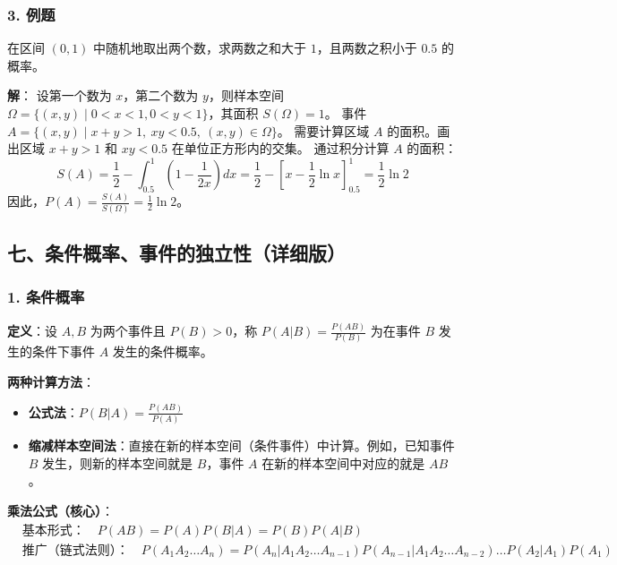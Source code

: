 \documentclass[12pt,a4paper]{ctexart}
\begin{document}
\subsubsection{3. 例题}
在区间 $(0,1)$ 中随机地取出两个数，求两数之和大于 $1$，且两数之积小于 $0.5$ 的概率。

\textbf{解}：
设第一个数为 $x$，第二个数为 $y$，则样本空间 $\Omega = \{(x,y) \mid 0 < x < 1, 0 < y < 1\}$，其面积 $S(\Omega) = 1$。
事件 $A = \{(x,y) \mid x+y > 1,\ xy < 0.5,\ (x,y) \in \Omega\}$。
需要计算区域 $A$ 的面积。画出区域 $x+y>1$ 和 $xy<0.5$ 在单位正方形内的交集。
通过积分计算 $A$ 的面积：
\[
    S(A) = \frac{1}{2} - \int_{0.5}^{1} \left(1 - \frac{1}{2x}\right) dx = \frac{1}{2} - \left[x - \frac{1}{2}\ln x\right]_{0.5}^{1} = \frac{1}{2} \ln 2
\]
因此，$\displaystyle P(A) = \frac{S(A)}{S(\Omega)} = \boxed{\frac{1}{2}\ln 2}$。

\subsection{七、条件概率、事件的独立性（详细版）}

\subsubsection{1. 条件概率}
\textbf{定义}：设 $A, B$ 为两个事件且 $P(B) > 0$，称 $\displaystyle P(A|B) = \frac{P(AB)}{P(B)}$ 为在事件 $B$ 发生的条件下事件 $A$ 发生的条件概率。

\textbf{两种计算方法}：
\begin{itemize}[noitemsep]
    \item \textbf{公式法}：$\displaystyle P(B|A) = \frac{P(AB)}{P(A)}$
    \item \textbf{缩减样本空间法}：直接在新的样本空间（条件事件）中计算。例如，已知事件 $B$ 发生，则新的样本空间就是 $B$，事件 $A$ 在新的样本空间中对应的就是 $AB$。
\end{itemize}

\textbf{乘法公式（核心）}：
\begin{align*}
     & \text{基本形式：}\quad P(AB) = P(A)P(B|A) = P(B)P(A|B)                                                                                        \\
     & \text{推广（链式法则）：}\quad P(A_1 A_2 \dots A_n) = P(A_n | A_1 A_2 \dots A_{n-1}) P(A_{n-1} | A_1 A_2 \dots A_{n-2}) \dots P(A_2 | A_1) P(A_1)
\end{align*}
\end{document}
